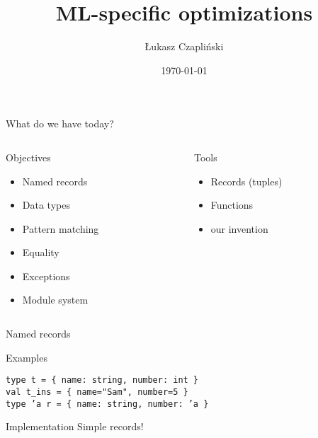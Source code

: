 \documentclass[presentation]{beamer}
\date{\today}
\title{ML-specific optimizations}
\author{Łukasz Czapliński}
\begin{document}
\maketitle

\begin{frame}{What do we have today?}
  \begin{columns}[T]
    \begin{column}{.48\textwidth}
      \begin{block}{Objectives}
        \begin{itemize}
        \item Named records
        \item Data types
        \item Pattern matching
        \item Equality
        \item Exceptions
        \item Module system
        \end{itemize}
      \end{block}
    \end{column}
    \begin{column}{.48\textwidth}
      \begin{block}{Tools}
        \begin{itemize}
        \item Records (tuples)
        \item Functions
        \item our invention
        \end{itemize}
      \end{block}
    \end{column}
  \end{columns}
\end{frame}

\begin{frame}[fragile]{Named records}
  \begin{block}{Examples}
\begin{verbatim}
type t = { name: string, number: int }
val t_ins = { name="Sam", number=5 }
type ’a r = { name: string, number: ’a }
\end{verbatim}
  \end{block}
  \begin{block}{Implementation}
  \pause
    Simple records!
  \end{block}
\end{frame}
\end{document}
